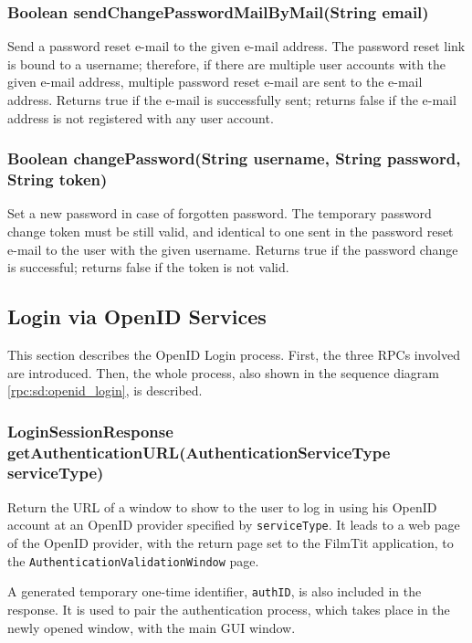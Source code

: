 {\subsubsection{Boolean sendChangePasswordMailByMail(String email)}
Send a password reset e-mail to the given e-mail address.
The password reset link is bound to a username;
therefore, if there are multiple user accounts with the given e-mail address,
multiple password reset e-mail are sent to the e-mail address.
Returns true if the e-mail is successfully sent;
returns false if the e-mail address is not registered with any user account.

\subsubsection{Boolean changePassword(String username, String password, String token)}
\label{sec:rpc_changePassword}
Set a new password in case of forgotten password.
The temporary password change token must be still valid,
and identical to one sent in the password reset e-mail
to the user with the given username.
Returns true if the password change is successful;
returns false if the token is not valid.

\subsection{Login via OpenID Services}
\label{subsubsec:gui_openid}

This section describes the OpenID Login process. First, the three RPCs involved are introduced. Then, the whole process, also shown in the sequence diagram \ref{rpc:sd:openid_login}, is described.

\subsubsection{LoginSessionResponse getAuthenticationURL(AuthenticationServiceType serviceType)}
\label{sec:rpc_getAuthenticationURL}

Return the URL of a window to show to the user to log in using his OpenID account at an OpenID provider specified by {\tt serviceType}. It leads to a web page of the OpenID provider, with the return page set to the FilmTit application, to the {\tt AuthenticationValidationWindow} page.

A generated temporary one-time identifier, {\tt authID}, is also included in the response. It is used to pair the authentication process, which takes place in the newly opened window, with the main GUI window.

}
